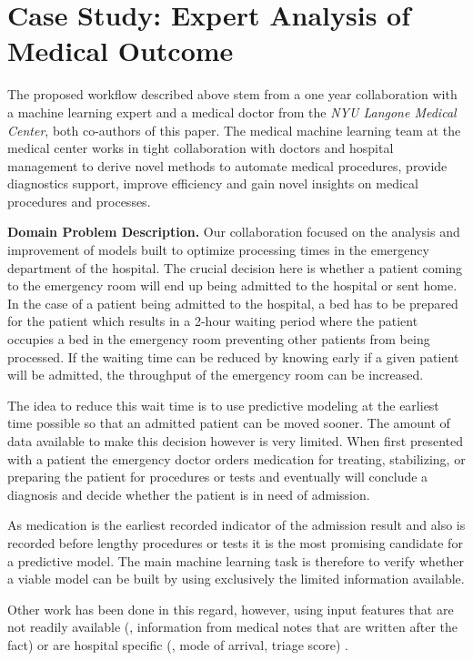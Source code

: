 \section{Case Study: Expert Analysis of Medical Outcome}
\label{sec:case_study}

The proposed workflow described above stem from a one year collaboration with a machine learning expert and a medical doctor from the \textit{NYU Langone Medical Center}, both co-authors of this paper. The medical machine learning team at the medical center works in tight collaboration with doctors and hospital management to derive novel methods to automate medical procedures, provide diagnostics support, improve efficiency and gain novel insights on medical procedures and processes.

\noindent \textbf{Domain Problem Description.}
Our collaboration focused on the analysis and improvement of models built to optimize processing times in the emergency department of the hospital. The crucial decision here is whether a patient coming to the emergency room will end up being admitted to the hospital or sent home. In the case of a patient being admitted to the hospital, a bed has to be prepared for the patient which results in a 2-hour waiting period where the patient occupies a bed in the emergency room preventing other patients from being processed. If the waiting time can be reduced by knowing early if a given patient will be admitted, the throughput of the emergency room can be increased.



The idea to reduce this wait time is to use predictive modeling at the earliest time possible so that an admitted patient can be moved sooner. The amount of data available to make this decision however is very limited. When first presented with a patient the emergency doctor orders medication for treating, stabilizing, or preparing the patient for procedures or tests and eventually will conclude a diagnosis and decide whether the patient is in need of admission.

As medication is the earliest recorded indicator of the admission result and also is recorded before lengthy procedures or tests it is the most promising candidate for a predictive model. The main machine learning task is therefore to verify whether a viable model can be built by using exclusively the limited information available.

Other work has been done in this regard, however, using input features that are not readily available (\eg, information from medical notes that are written after the fact) or are hospital specific (\eg, mode of arrival, triage score) \cite{pmid21705374,pmid24421344,pmid24509606}.

